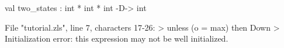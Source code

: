 \chklistingfalse
{}
\begin{ChkListingMsg}
val two_states : int * int * int -D-> int 
\end{ChkListingMsg}
\begin{ChkListingErr}
File "tutorial.zls", line 7, characters 17-26:
>          unless (o = max) then Down
>                 ^^^^^^^^^
Initialization error: this expression may not be well initialized.
\end{ChkListingErr}
